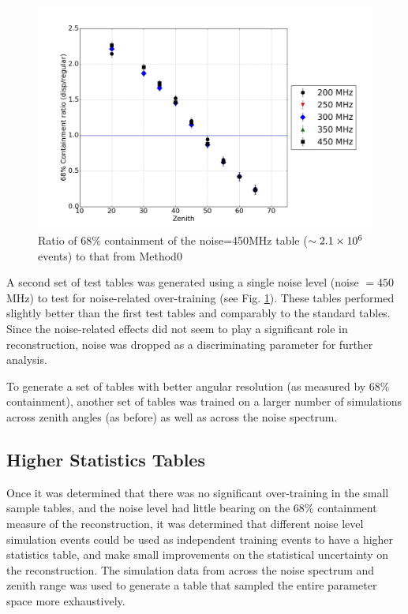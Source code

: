 \documentclass[main.tex]{subfiles}
\begin{document}
\begin{figure}[htbp]
  \centering
  \includegraphics[width=0.8\linewidth]{images/disp_450_ratio_xzen}
  \caption[\disp table reconstruction vs noise]{Ratio of 68\% containment of the noise=450MHz \disp table ($\sim 2.1\times 10^{6}$ events) to that from Method0}
  \label{fig:disp_ratio_450}
\end{figure}

A second set of test \disp tables was generated using a single noise level (noise $= 450$ MHz) to test for noise-related over-training (see Fig. \ref{fig:disp_ratio_450}). These tables performed slightly better than the first test tables and comparably to the standard \disp tables. Since the noise-related effects did not seem to play a significant role in reconstruction, noise was dropped as a discriminating parameter for further analysis.

To generate a set of \disp tables with better angular resolution (as measured by 68\% containment), another set of \disp tables was trained on a larger number of simulations across zenith angles (as before) as well as across the noise spectrum.

\subsection{Higher Statistics Tables}
Once it was determined that there was no significant over-training in the small sample \disp tables, and the noise level had little bearing on the 68\% containment measure of the reconstruction, it was determined that different noise level simulation events could be used as independent training events to have a higher statistics \disp table, and make small improvements on the statistical uncertainty on the reconstruction. The simulation data from across the noise spectrum and zenith range was used to generate a \disp table that sampled the entire parameter space more exhaustively.
\end{document}
